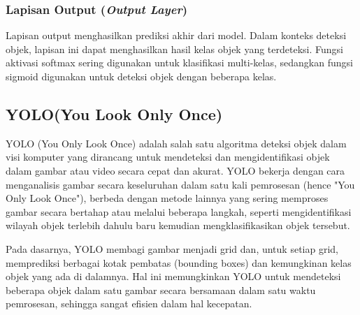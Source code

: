 \subsubsection{Lapisan Output (\emph{Output Layer})}
Lapisan output menghasilkan prediksi akhir dari model. Dalam konteks deteksi objek, lapisan ini dapat menghasilkan hasil kelas objek yang terdeteksi. Fungsi aktivasi softmax sering digunakan untuk klasifikasi multi-kelas, sedangkan fungsi sigmoid digunakan untuk deteksi objek dengan beberapa kelas.


\subsection{YOLO(You Look Only Once)}
YOLO (You Only Look Once) adalah salah satu algoritma deteksi objek dalam visi komputer yang dirancang untuk mendeteksi dan mengidentifikasi objek dalam gambar atau video secara cepat dan akurat. YOLO bekerja dengan cara menganalisis gambar secara keseluruhan dalam satu kali pemrosesan (hence "You Only Look Once"), berbeda dengan metode lainnya yang sering memproses gambar secara bertahap atau melalui beberapa langkah, seperti mengidentifikasi wilayah objek terlebih dahulu baru kemudian mengklasifikasikan objek tersebut.

Pada dasarnya, YOLO membagi gambar menjadi grid dan, untuk setiap grid, memprediksi berbagai kotak pembatas (bounding boxes) dan kemungkinan kelas objek yang ada di dalamnya. Hal ini memungkinkan YOLO untuk mendeteksi beberapa objek dalam satu gambar secara bersamaan dalam satu waktu pemrosesan, sehingga sangat efisien dalam hal kecepatan.

\newpage
